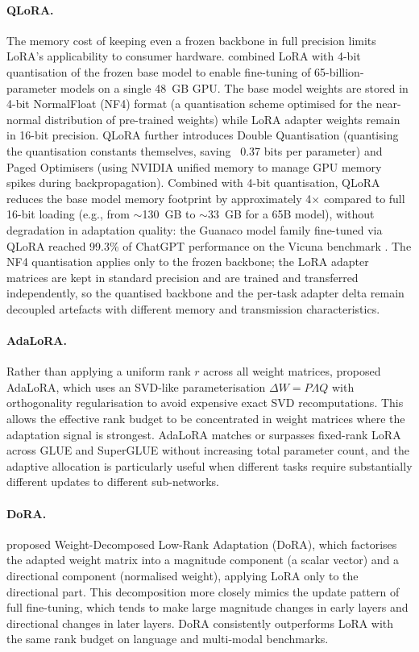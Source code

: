 \paragraph{QLoRA.}
The memory cost of keeping even a frozen backbone in full precision limits LoRA's applicability to consumer hardware. \citet{Dettmers2023} combined LoRA with 4-bit quantisation of the frozen base model to
enable fine-tuning of 65-billion-parameter models on a single 48~GB GPU. The base model
weights are stored in 4-bit NormalFloat (NF4) format  (a quantisation scheme optimised
for the near-normal distribution of pre-trained weights) while LoRA adapter weights
remain in 16-bit precision. QLoRA further introduces Double Quantisation (quantising
the quantisation constants themselves, saving ~0.37 bits per parameter) and Paged
Optimisers (using NVIDIA unified memory to manage GPU memory spikes during
backpropagation). Combined with 4-bit quantisation, QLoRA reduces the base model memory footprint by approximately 4$\times$ compared to full 16-bit loading (e.g., from $\sim$130~GB to $\sim$33~GB for a 65B model), without degradation in adaptation quality: the
Guanaco model family fine-tuned via QLoRA reached 99.3\% of ChatGPT performance on the
Vicuna benchmark \citep{Dettmers2023}. The NF4 quantisation applies only to the frozen
backbone; the LoRA adapter matrices are kept in standard precision and are trained and
transferred independently, so the quantised backbone and the per-task adapter delta
remain decoupled artefacts with different memory and transmission characteristics.

\paragraph{AdaLoRA.}
Rather than applying a uniform rank $r$ across all weight matrices, \citet{ZhangAdaLoRA2023}
proposed AdaLoRA, which uses an SVD-like parameterisation
$\Delta W = P \Lambda Q$ with orthogonality regularisation to avoid expensive exact SVD
recomputations. This allows the effective rank budget to be concentrated in weight
matrices where the adaptation signal is strongest. AdaLoRA matches or surpasses fixed-rank
LoRA across GLUE and SuperGLUE without increasing total parameter count, and the
adaptive allocation is particularly useful when different tasks require substantially
different updates to different sub-networks.

\paragraph{DoRA.}
\citet{LiuDoRA2024} proposed Weight-Decomposed Low-Rank Adaptation (DoRA), which
factorises the adapted weight matrix into a magnitude component (a scalar vector) and
a directional component (normalised weight), applying LoRA only to the directional part.
This decomposition more closely mimics the update pattern of full fine-tuning, which tends
to make large magnitude changes in early layers and directional changes in later layers.
DoRA consistently outperforms LoRA with the same rank budget on language and multi-modal
benchmarks.

